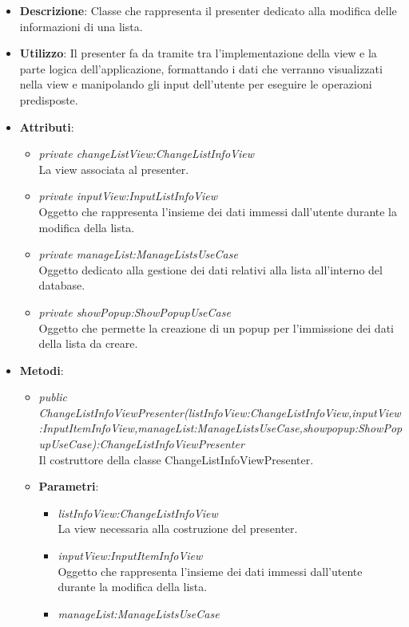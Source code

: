 \begin{itemize}
\item \textbf{Descrizione}: Classe che rappresenta il presenter dedicato alla modifica delle informazioni di una lista.
\item \textbf{Utilizzo}: Il presenter fa da tramite tra l'implementazione della view e la parte logica dell'applicazione, formattando i dati che verranno visualizzati nella view e manipolando gli input dell'utente per eseguire le operazioni predisposte.
\item \textbf{Attributi}:
	\begin{itemize}
	\item \textit{private changeListView:ChangeListInfoView}\\
		La view associata al presenter.
	\item \textit{private inputView:InputListInfoView}\\
		Oggetto che rappresenta l'insieme dei dati immessi dall'utente durante la modifica della lista.
	\item \textit{private manageList:ManageListsUseCase}\\
Oggetto dedicato alla gestione dei dati relativi alla lista all'interno del database.
	\item \textit{private showPopup:ShowPopupUseCase}\\
		Oggetto che permette la creazione di un popup per l'immissione dei dati della lista da creare.	
	\end{itemize} 
\item \textbf{Metodi}:
	\begin{itemize}
	\item \textit{public ChangeListInfoViewPresenter(listInfoView:ChangeListInfoView,inputView:InputItemInfoView,manageList:ManageListsUseCase,showpopup:ShowPopupUseCase):ChangeListInfoViewPresenter}\\
Il costruttore della classe ChangeListInfoViewPresenter.
			\item{\textbf{Parametri}: \begin{itemize}
			\item \textit{listInfoView:ChangeListInfoView}\\
			La view necessaria alla costruzione del presenter.
			\item \textit{inputView:InputItemInfoView}\\
			  Oggetto che rappresenta l'insieme dei dati immessi dall'utente durante la modifica della lista.
			\item \textit{manageList:ManageListsUseCase}\\

\end{itemize}}
\end{itemize}
\end{itemize}
